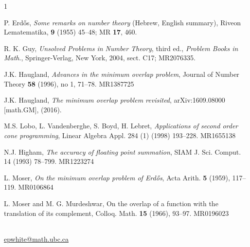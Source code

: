 \documentclass[12pt]{article}
\numberwithin{equation}{section}
\begin{document}
\begin{thebibliography}{1}

 
 P. Erd\H{o}s, \emph{Some remarks on number theory} (Hebrew, English summary), Riveon Lematematika, \textbf{9} (1955) 45--48; MR \textbf{17}, 460.

 R. K. Guy, \emph{Unsolved Problems in Number Theory}, third ed., \emph{Problem Books in Math}., Springer-Verlag, New York, 2004, sect. C17; MR2076335.

 J.K. Haugland, \emph{Advances in the minimum overlap problem}, Journal of Number Theory \textbf{58} (1996), no 1, 71--78. MR1387725

 J.K. Haugland, \emph{The minimum overlap problem revisited}, arXiv:1609.08000 [math.GM], (2016). 

 M.S. Lobo, L. Vandenberghe, S. Boyd, H. Lebret, \emph{Applications of second order cone programming}, Linear Algebra Appl. 284 (1) (1998) 193--228. MR1655138

 N.J. Higham, \emph{The accuracy of floating point summation}, SIAM J. Sci. Comput. 14 (1993) 78--799. MR1223274

 L. Moser, \emph{On the minimum overlap problem of Erd\H{o}s}, Acta Arith. \textbf{5} (1959), 117--119. MR0106864

 L. Moser and M. G. Murdeshwar, On the overlap of a function with the translation of its complement, Colloq. Math. \textbf{15} (1966), 93--97. MR0196023



\vspace{1cm}

\begin{small}
 \\
\url{epwhite@math.ubc.ca}\\

\end{small}





\end{thebibliography}
\end{document}
